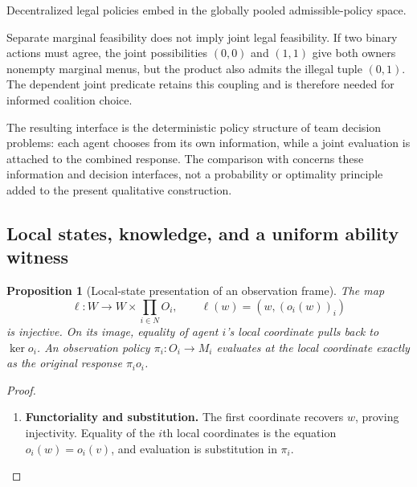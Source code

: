 \documentclass[11pt,a4paper]{article}
\numberwithin{equation}{section}
\newtheorem{proposition}[theorem]{Proposition}
\theoremstyle{definition}
\theoremstyle{remark}
\theoremstyle{plain}
\begin{document}
\noindent Decentralized legal policies embed in the globally pooled admissible-policy space.
\begin{center}
\end{center}

Separate marginal feasibility does not imply joint legal
feasibility. If two binary actions must agree, the joint possibilities
$(0,0)$ and $(1,1)$ give both owners nonempty marginal menus, but the
product also admits the illegal tuple $(0,1)$. The dependent joint
predicate retains this coupling and is therefore needed for informed
coalition choice.

The resulting interface is the deterministic policy structure of
team decision problems: each agent chooses from its own information,
while a joint evaluation is attached to the combined response. The
comparison with \citet{Radner1962TeamDecisionProblems} concerns these
information and decision interfaces, not a probability or optimality
principle added to the present qualitative construction.

\subsection{Local states, knowledge, and a uniform ability witness}
\label{sec:egt-local-state-comparison}

\begin{proposition}[Local-state presentation of an observation frame]
\label{prop:egt-interpreted-system-comparison}
The map
\[
 \ell:W\longrightarrow W\times\prod_{i\in N}O_i,\qquad
 \ell(w)=(w,(o_i(w))_i)
\]
is injective. On its image, equality of agent $i$'s local coordinate
pulls back to $\ker o_i$. An observation policy $\pi_i:O_i\to M_i$
evaluates at the local coordinate exactly as the original response
$\pi_io_i$.
\end{proposition}
\begin{proof}
\leavevmode
\begin{enumerate}[label=\textup{(\arabic*)},leftmargin=*,itemsep=4pt,topsep=3pt]
  \item \textbf{Functoriality and substitution.} The first coordinate recovers $w$, proving injectivity. Equality of the $i$th local coordinates is the equation
$o_i(w)=o_i(v)$, and evaluation is substitution in $\pi_i$.
\end{enumerate}
\end{proof}
\end{document}
